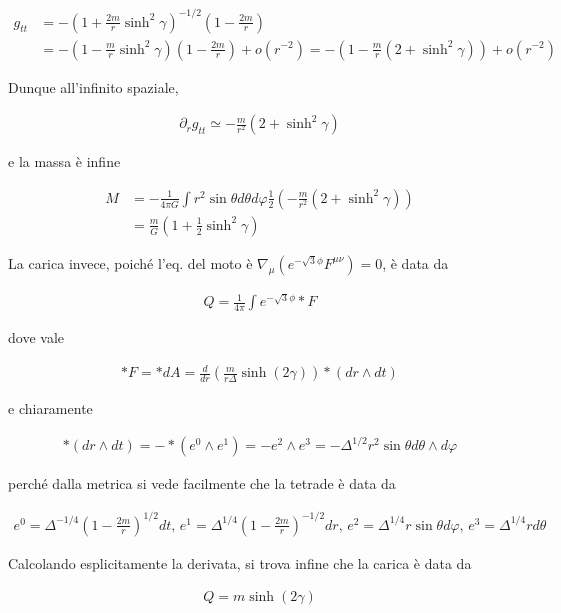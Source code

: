 \documentclass{report}
\begin{document}
{    \begin{align}
        g_{tt} &= -\left(1+\frac{2m}{r}\sinh^2\gamma \right)^{-1/2}\left(1-\frac{2m}{r} \right) \\
        &= -\left(1-\frac{m}{r}\sinh^2\gamma \right)\left(1-\frac{2m}{r} \right) + o(r^{-2}) = -\left(1-\frac{m}{r}(2 + \sinh^2\gamma) \right) + o(r^{-2})
    \end{align}

    Dunque all'infinito spaziale, 

    \begin{align}
        \partial_r g_{tt} \simeq -\frac{m}{r^2}(2+\sinh^2\gamma)
    \end{align}

    e la massa è infine 

    \begin{align}
        M &= -\frac{1}{4\pi G}\int r^2\sin\theta d\theta d\varphi \frac{1}{2}\left(-\frac{m}{r^2}(2+\sinh^2\gamma)\right) \\
        &= \frac{m}{G}\left(1+\frac{1}{2}\sinh^2\gamma \right)
    \end{align}


}


La carica invece, poiché l'eq. del moto è \(\nabla_\mu (e^{-\sqrt{3}\phi}F^{\mu\nu}) =0\), è data da 

\begin{align}
    Q = \frac{1}{4\pi}\int e^{-\sqrt{3}\phi}*F
\end{align}

dove vale 

\begin{align}
    *F = *dA = \frac{d}{dr}\left(\frac{m}{r\Delta}\sinh(2\gamma) \right) *(dr \wedge dt)
\end{align}

e chiaramente 

\begin{align}
    * (dr \wedge dt) = -*(e^0 \wedge e^1) = -e^2 \wedge e^3 = -\Delta^{1/2}r^2\sin\theta d\theta \wedge d\varphi
\end{align}

perché dalla metrica si vede facilmente che la tetrade è data da 

\begin{align}
    e^0 = \Delta^{-1/4}\left(1-\frac{2m}{r} \right)^{1/2}dt, \, e^1 = \Delta^{1/4}\left(1-\frac{2m}{r} \right)^{-1/2}dr, \, e^2 = \Delta^{1/4}r\sin\theta d\varphi,  \, e^3 = \Delta^{1/4}rd\theta
\end{align}

Calcolando esplicitamente la derivata, si trova infine che la carica è data da 

\begin{align}
    Q = m\sinh(2\gamma)
\end{align}
\end{document}
